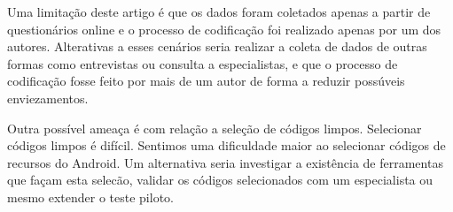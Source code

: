 Uma limitação deste artigo é que os dados foram coletados apenas a partir de questionários online e o processo de codificação foi realizado apenas por um dos autores. Alterativas a esses cenários seria realizar a coleta de dados de outras formas como entrevistas ou consulta a especialistas, e que o processo de codificação fosse feito por mais de um autor de forma a reduzir possúveis enviezamentos.

Outra possível ameaça é com relação a seleção de códigos limpos. Selecionar códigos limpos é difícil. Sentimos uma dificuldade maior ao selecionar códigos de recursos do Android. Um alternativa seria investigar a existência de ferramentas que façam esta selecão, validar os códigos selecionados com um especialista ou mesmo extender o teste piloto. 